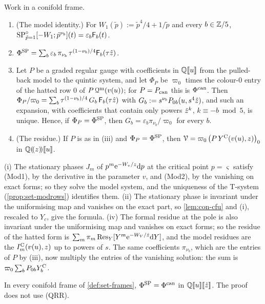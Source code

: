 \begin{lem}
\label{lem:con-id}
Work in a conifold frame.
\begin{enumerate}
\item (The model identity.) For $W_1(\tilde p):=\tilde p^4/4+1/\tilde p$ and every $b\in\mathbb{Z}/5$, $\mathrm{SP}^{\circ}_{\tilde p=1}[-W_1;\tilde p^{\nu_b}](t)=\varepsilon_b\mathsf{F}_b(t)$.
\item $\Phi^{\mathrm{SP}}=\sum_b\varepsilon_b\,\pi_{\nu_b}\,\tau^{(1-\nu_b)/4}\mathsf{F}_b(\tau\hat{z})$.
\item Let $P$ be a graded regular gauge with coefficients in $\mathbb{Q}[\![ u ]\!]$ from the pulled-back model to the quintic system, and let $\Phi_P$ be $\varpi_0$ times the colour-$0$ entry of the hatted row $0$ of $P\,\mathcal{Q}^{\mathrm m}(v(u))$; for $P=P_{\mathrm{can}}$ this is $\Phi^{\mathrm{can}}$. Then $\Phi_P/\varpi_0=\sum_b\tau^{(1-\nu_b)/4}\,G_b\,\mathsf{F}_b(\tau\hat{z})$ with $G_b:=s^{\nu_b}P_{0b}(u,s^4\hat{z})$, and such an expansion, with coefficients that contain only powers $\hat{z}^k$, $k\equiv-b\bmod5$, is unique. Hence, if $\Phi_P=\Phi^{\mathrm{SP}}$, then $G_b=\varepsilon_b\pi_{\nu_b}/\varpi_0$ for every $b$.
\item (The residue.) If $P$ is as in (iii) and $\Phi_P=\Phi^{\mathrm{SP}}$, then $\mathcal{V}=\varpi_0\,\bigl(P\,Y^{\mathrm{C}}(v(u),z)\bigr)_0$ in $\mathbb{Q}(\!(z)\!)[\![ u ]\!]$.
\end{enumerate}
\end{lem}

\begin{sketch}
(i) The stationary phases $J_m$ of $p^m\mathrm{e}^{-W_{v}/z}\mathrm{d} p$ at the critical point $p=\varsigma$ satisfy (Mod1), by the derivative in the parameter $v$, and (Mod2), by the vanishing on exact forms; so they solve the model system, and the uniqueness of the T-system (\cref{prop:set-modrows}) identifies them. (ii) The stationary phase is invariant under the uniformising map and vanishes on the exact part, so \cref{lem:con-cfu} and (i), rescaled to $Y_c$, give the formula. (iv) The formal residue at the pole is also invariant under the uniformising map and vanishes on exact forms; so the residue of the hatted form is $\sum_m\pi_m\operatorname*{Res}_Y[Y^m\mathrm{e}^{-W_V/\hat{z}}\mathrm{d} Y]$, and the model residues are the $I^{\mathrm{C}}_m(v(u),z)$ up to powers of $s$. The same coefficients $\pi_{\nu_b}$, which are the entries of $P$ by (iii), now multiply the entries of the vanishing solution: the sum is $\varpi_0\sum_bP_{0b}Y^{\mathrm{C}}_b$.
\end{sketch}

\begin{thm}
\label{thm:con-Pb}
In every conifold frame of \cref{def:set-frames}, $\Phi^{\mathrm{SP}}=\Phi^{\mathrm{can}}$ in $\mathbb{Q}[\![ u ]\!][\![ \hat{z} ]\!]$. The proof does not use (QRR).
\end{thm}

